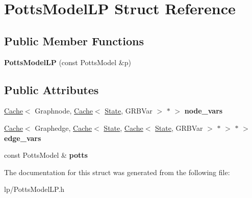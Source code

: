 \hypertarget{structPottsModelLP}{
\section{PottsModelLP Struct Reference}
\label{structPottsModelLP}
}
\subsection*{Public Member Functions}
\begin{DoxyCompactItemize}
\item 
\hypertarget{structPottsModelLP_af041b236eacf847879e1a2ba53b6e987}{
{\bfseries PottsModelLP} (const PottsModel \&p)}
\label{structPottsModelLP_af041b236eacf847879e1a2ba53b6e987}

\end{DoxyCompactItemize}
\subsection*{Public Attributes}
\begin{DoxyCompactItemize}
\item 
\hypertarget{structPottsModelLP_ac572d15bc61963f636a39e752951cf31}{
\hyperlink{classCache}{Cache}$<$ Graphnode, \hyperlink{classCache}{Cache}$<$ \hyperlink{structState}{State}, GRBVar $>$ $\ast$ $>$ {\bfseries node\_\-vars}}
\label{structPottsModelLP_ac572d15bc61963f636a39e752951cf31}

\item 
\hypertarget{structPottsModelLP_a00e3418b717ea5c1a0334dc30dafcdcc}{
\hyperlink{classCache}{Cache}$<$ Graphedge, \hyperlink{classCache}{Cache}$<$ \hyperlink{structState}{State}, \hyperlink{classCache}{Cache}$<$ \hyperlink{structState}{State}, GRBVar $>$ $\ast$ $>$ $\ast$ $>$ {\bfseries edge\_\-vars}}
\label{structPottsModelLP_a00e3418b717ea5c1a0334dc30dafcdcc}

\item 
\hypertarget{structPottsModelLP_ad829fe7b19ca64ae117303082784d110}{
const PottsModel \& {\bfseries potts}}
\label{structPottsModelLP_ad829fe7b19ca64ae117303082784d110}

\end{DoxyCompactItemize}


The documentation for this struct was generated from the following file:\begin{DoxyCompactItemize}
\item 
lp/PottsModelLP.h\end{DoxyCompactItemize}
